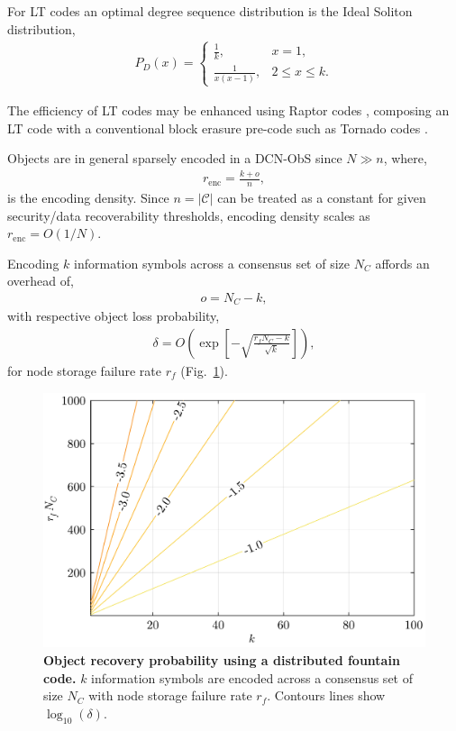 For LT codes an optimal degree sequence distribution is the Ideal Soliton distribution,
\begin{align}
	P_D(x) = \begin{cases}
 		\frac{1}{k}, &x=1,\\
 		\frac{1}{x(x-1)}, &2\leq x\leq k.
	\end{cases}
\end{align}

The efficiency of LT codes may be enhanced using Raptor codes \cite{RaptorCodes, RaptorCodes2}, composing an LT code with a conventional block erasure pre-code such as Tornado codes \cite{TornadoCodes}.

Objects are in general sparsely encoded in a DCN-ObS since $N\gg n$, where,
\begin{align}
	r_\mathrm{enc}=\frac{k+o}{n},
\end{align}
is the encoding density. Since $n=|\mathcal{C}|$ can be treated as a constant for given security/data recoverability thresholds, encoding density scales as $r_\mathrm{enc}=O(1/N)$.

Encoding $k$ information symbols across a consensus set of size $N_C$ affords an overhead of,
\begin{align}
	o = N_C - k,
\end{align}
with respective object loss probability,
\begin{align}
	\delta = O\left(\exp\left[-\sqrt{\frac{r_f N_C-k}{\sqrt{k}}} \right]\right),
\end{align}
for node storage failure rate $r_f$ (Fig.~\ref{fig:fountain}).

\begin{figure}[!htb]
	\includegraphics[width=\columnwidth]{figs/fountain.pdf}
	\caption{\textbf{Object recovery probability using a distributed fountain code.} $k$ information symbols are encoded across a consensus set of size $N_C$ with node storage failure rate $r_f$. Contours lines show $\log_\mathrm{10}(\delta)$.} \label{fig:fountain}
\end{figure}

